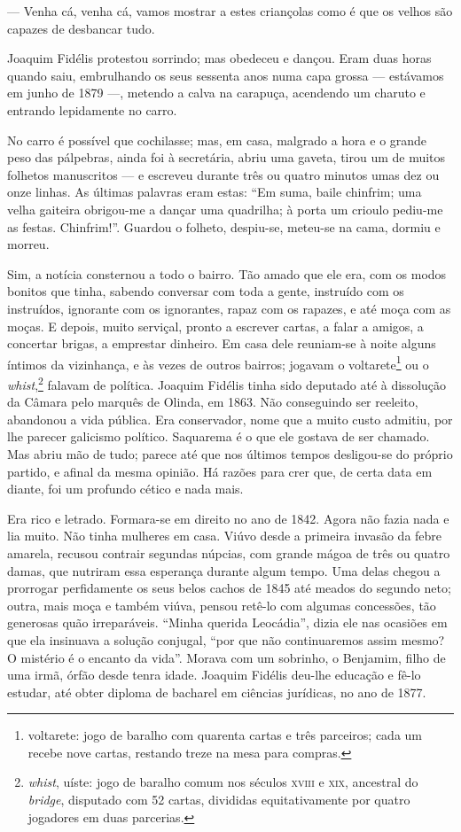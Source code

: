 --- Venha cá, venha cá, vamos mostrar a estes criançolas como é que os
velhos são capazes de desbancar tudo.

Joaquim Fidélis protestou sorrindo; mas obedeceu e dançou. Eram duas
horas quando saiu, embrulhando os seus sessenta anos numa capa grossa
--- estávamos em junho de 1879 ---, metendo a calva na carapuça,
acendendo um charuto e entrando lepidamente no carro.

No carro é possível que cochilasse; mas, em casa, malgrado a hora e o
grande peso das pálpebras, ainda foi à secretária, abriu uma gaveta,
tirou um de muitos folhetos manuscritos --- e escreveu durante três ou
quatro minutos umas dez ou onze linhas. As últimas palavras eram estas:
``Em suma, baile chinfrim; uma velha gaiteira obrigou-me a dançar uma
quadrilha; à porta um crioulo pediu-me as festas. Chinfrim!''. Guardou o
folheto, despiu-se, meteu-se na cama, dormiu e morreu.

Sim, a notícia consternou a todo o bairro. Tão amado que ele era, com os
modos bonitos que tinha, sabendo conversar com toda a gente, instruído
com os instruídos, ignorante com os ignorantes, rapaz com os rapazes, e
até moça com as moças. E depois, muito serviçal, pronto a escrever
cartas, a falar a amigos, a concertar brigas, a emprestar dinheiro. Em
casa dele reuniam-se à noite alguns íntimos da vizinhança, e às vezes de
outros bairros; jogavam o voltarete\footnote{voltarete: jogo de baralho
  com quarenta cartas e três parceiros; cada um recebe nove cartas,
  restando treze na mesa para compras.} ou o \emph{whist},\footnote{\emph{whist},
  uíste: jogo de baralho comum nos séculos \textsc{xviii} e \textsc{xix}, ancestral do
  \emph{bridge}, disputado com 52 cartas, divididas equitativamente por
  quatro jogadores em duas parcerias.} falavam de política. Joaquim
Fidélis tinha sido deputado até à dissolução da Câmara pelo marquês de
Olinda, em 1863. Não conseguindo ser reeleito, abandonou a vida pública.
Era conservador, nome que a muito custo admitiu, por lhe parecer
galicismo político. Saquarema é o que ele gostava de ser chamado. Mas
abriu mão de tudo; parece até que nos últimos tempos desligou-se do
próprio partido, e afinal da mesma opinião. Há razões para crer que, de
certa data em diante, foi um profundo cético e nada mais.

Era rico e letrado. Formara-se em direito no ano de 1842. Agora não
fazia nada e lia muito. Não tinha mulheres em casa. Viúvo desde a
primeira invasão da febre amarela, recusou contrair segundas núpcias,
com grande mágoa de três ou quatro damas, que nutriram essa esperança
durante algum tempo. Uma delas chegou a prorrogar perfidamente os seus
belos cachos de 1845 até meados do segundo neto; outra, mais moça e
também viúva, pensou retê-lo com algumas concessões, tão generosas quão
irreparáveis. ``Minha querida Leocádia'', dizia ele nas ocasiões em que
ela insinuava a solução conjugal, ``por que não continuaremos assim
mesmo? O mistério é o encanto da vida''. Morava com um sobrinho, o
Benjamim, filho de uma irmã, órfão desde tenra idade. Joaquim Fidélis
deu-lhe educação e fê-lo estudar, até obter diploma de bacharel em
ciências jurídicas, no ano de 1877.

